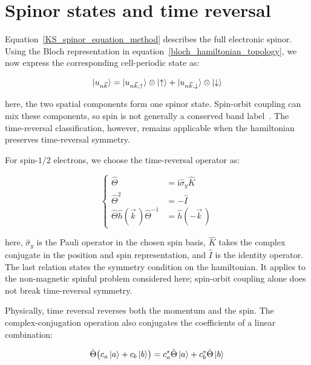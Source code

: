 \newpage
\FloatBarrier
\section{Spinor states and time reversal}
\label{sec:spinors_time_reversal_appendix}

Equation~\eqref{KS_spinor_equation_method} describes the full electronic spinor.
Using the Bloch representation in equation~\eqref{bloch_hamiltonian_topology},
we now express the corresponding cell-periodic state as:

\begin{equation}
    \ket{u_{n\vec{k}}}
    =\ket{u_{n\vec{k},\uparrow}}\otimes\ket{\uparrow}
    +\ket{u_{n\vec{k},\downarrow}}\otimes\ket{\downarrow}
\label{cell_periodic_spinor_topology}
\end{equation}

here, the two spatial components form one spinor state.
Spin-orbit coupling can mix these components, so spin is not generally a conserved band label~\cite{bihlmayer2022rashba}.
The time-reversal classification, however, remains applicable when the hamiltonian preserves time-reversal symmetry.

For spin-$1/2$ electrons, we choose the time-reversal operator as:

\begin{equation}
\left\{\begin{aligned}
    \hat{\Theta}&=\mathrm{i}\hat{\sigma}_y\hat{K} \\
    \hat{\Theta}^2&=-\hat{I} \\
    \hat{\Theta}\hat{h}(\vec{k}\,)\hat{\Theta}^{-1}
    &=\hat{h}(-\vec{k}\,)
\end{aligned}\right.
\label{spinful_time_reversal_topology}
\end{equation}

here, $\hat{\sigma}_y$ is the Pauli operator in the chosen spin basis,
$\hat{K}$ takes the complex conjugate in the position and spin representation,
and $\hat{I}$ is the identity operator.
The last relation states the symmetry condition on the hamiltonian.
It applies to the non-magnetic spinful problem considered here;
spin-orbit coupling alone does not break time-reversal symmetry.

Physically, time reversal reverses both the momentum and the spin.
The complex-conjugation operation also conjugates the coefficients of a linear combination:

\begin{equation}
    \hat{\Theta}\bigl(c_a\ket{a}+c_b\ket{b}\bigr)
    =c_a^*\hat{\Theta}\ket{a}+c_b^*\hat{\Theta}\ket{b}
\label{time_reversal_antilinearity_topology}
\end{equation}


